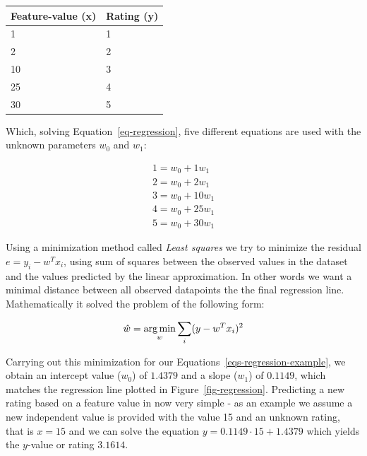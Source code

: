 \begin{table}[H]
  \centering
  \begin{tabular}{ll}
  \toprule
  Feature-value (x) & Rating (y) \\
  \midrule
   1 & 1 \\
   2  & 2 \\
   10  & 3 \\
   25 & 4 \\
   30  & 5 \\
   \bottomrule
  \end{tabular}
\end{table}

Which, solving Equation~\ref{eq-regression}, five different equations are
used with the unknown parameters $w_0$ and $w_1$:

\begin{equation}
  \label{eqs-regression-example}
  \begin{split}
    1 = w_0 + 1 w_1 \\
    2 = w_0 + 2 w_1 \\
    3 = w_0 + 10 w_1 \\
    4 = w_0 + 25 w_1 \\
    5 = w_0 + 30 w_1
  \end{split}
\end{equation}

Using a minimization method called \textit{Least squares} we try to minimize
the residual $e = y_i - w^{T}x_{i}$, using sum of squares between the observed
values in the dataset and the values predicted by the linear approximation. In
other words we want a minimal distance between all observed datapoints the the
final regression line. Mathematically it solved the problem of the following
form:

\begin{equation}
  \label{least-squares}
  \hat{w} = \operatorname*{arg\,min}_w \sum_{i} (y - w^{T}x_{i})^2
\end{equation}

Carrying out this minimization for our Equations~\ref{eqs-regression-example},
we obtain an intercept value ($w_0$) of $1.4379$ and a slope ($w_1$) of
$0.1149$, which matches the regression line plotted in
Figure~\ref{fig-regression}. Predicting a new rating based on a feature value
in now very simple - as an example we assume a new independent value is
provided with the value 15 and an unknown rating, that is $x=15$ and we can
solve the equation $y = 0.1149 \cdot 15 + 1.4379$ which yields the $y$-value or
rating $3.1614$.

